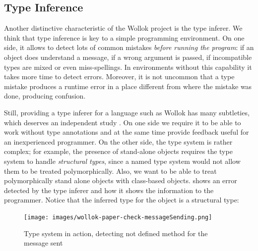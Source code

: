 \subsection{Type Inference}
Another distinctive characteristic of the Wollok project is the type inferer.
We think that type inference is key to a simple programming environment.
On one side, it allows to detect lots of common mistakes \emph{before running the program}:
if an object does understand a message, if a wrong argument is passed, if incompatible types are mixed or even miss-spellings.
In environments without this capability it takes more time to detect errors.
Moreover, it is not uncommon that a type mistake produces a runtime error in a place different from where the mistake was done, producing confusion.

Still, providing a type inferer for a language such as Wollok has many subtleties, which deserves an independent study \cite{passerini_nicolas_extensible_2014}.
On one side we require it to be able to work without type annotations and at the same time provide feedback useful for an inexperienced programmer.
On the other side, the type system is rather complex;
for example, the presence of stand-alone objects requires the type system to handle \emph{structural types}, since a named type system would not allow them to be treated polymorphically.
Also, we want to be able to treat polymorphically stand alone objects with class-based objects.
 shows an error detected by the type inferer and how it shows the information to the programmer.
Notice that the inferred type for the object  is a structural type: 

\begin{figure}[ht]
    \centering
	\texttt{[image: images/wollok-paper-check-messageSending.png]}
    \caption{Type system in action, detecting not defined method for the message sent}
    \label{fig:check-messageSending.png}
\end{figure}



